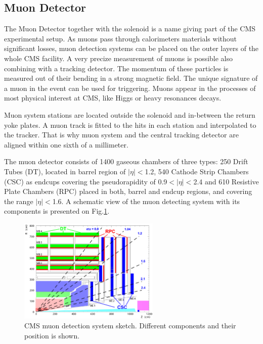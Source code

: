 \subsection{Muon Detector}

The Muon Detector\cite{CMSatLHC} together with the solenoid is a name giving part of the CMS experimental setup. As muons pass through calorimeters materials
without significant losses\cite{MuonStop}, muon detection systems can be placed on the outer layers of the whole CMS facility. A very precize measurement of muons 
is possible also combining with a tracking detector. The momentum of these particles is measured out of their bending in a strong magnetic field.
The unique signature of a muon in the event can be used for triggering. Muons appear in the processes
of most physical interest at CMS, like Higgs or heavy resonances decays.

Muon system stations are located outside the solenoid and in-between the return yoke plates. A muon track is fitted to the hits in each station 
and interpolated to the tracker. That is why muon system and the central tracking detector are aligned within one sixth of a millimeter.

The muon detector consists of 1400 gaseous chambers of three types: 250 Drift Tubes (DT), located in barrel region of $|\eta| < $1.2, 540 Cathode Strip Chambers
(CSC) as endcups covering the pseudorapidity of 0.9$ < |\eta| < $2.4 and 610 Resistive Plate Chambers (RPC) placed in both, barrel and endcup regions, and covering
the range $|\eta| < $1.6. A schematic view of the muon detecting system with its components is presented on Fig.\ref{fig:muond}.

\begin{figure}[t]
  \centering
  \includegraphics[width=0.6\textwidth]{02_experimental_setup/plots/Figures_Experimental_Apparatus_MuonDetector.png}
  \caption{CMS muon detection system sketch. Different components and their position is shown.}
  \label{fig:muond}
\end{figure}

